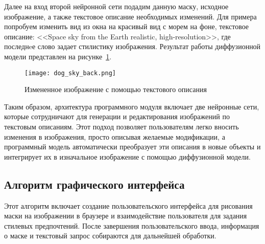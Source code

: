 Далее на вход второй нейронной сети подадим данную маску, исходное 
изображение, а также текстовое описание необходимых изменений. Для 
примера попробуем изменить вид из окна на красивый вид с морем на фоне, 
текстовое описание: <<Space sky from the Earth realistic, high-resolution>>, где последнeе слово задает стилистику изображения. Результат работы диффузионной модели представлен на рисунке~\ref{dev::dog_sky_back}.

\begin{figure}[ht]
    \centering
    \texttt{[image: dog\_sky\_back.png]}
    \caption{Измененное изображение с помощью текстового описания}
    \label{dev::dog_sky_back}
\end{figure}

Таким образом, архитектура программного модуля включает две нейронные сети, которые сотрудничают для генерации и редактирования изображений по текстовым описаниям. Этот подход позволяет пользователям легко вносить изменения в изображения, просто описывая желаемые модификации, а программный модель автоматически преобразует эти описания в новые объекты и интегрирует их в изначальное изображение с помощью диффузионной модели.

\subsection{Алгоритм графического интерфейса}

Этот алгоритм включает создание пользовательского интерфейса для
рисования маски на изображении в браузере и взаимодействие пользователя для задания стилевых предпочтений. После завершения пользовательского ввода, информация о маске и текстовый запрос собираются для дальнейшей обработки.

